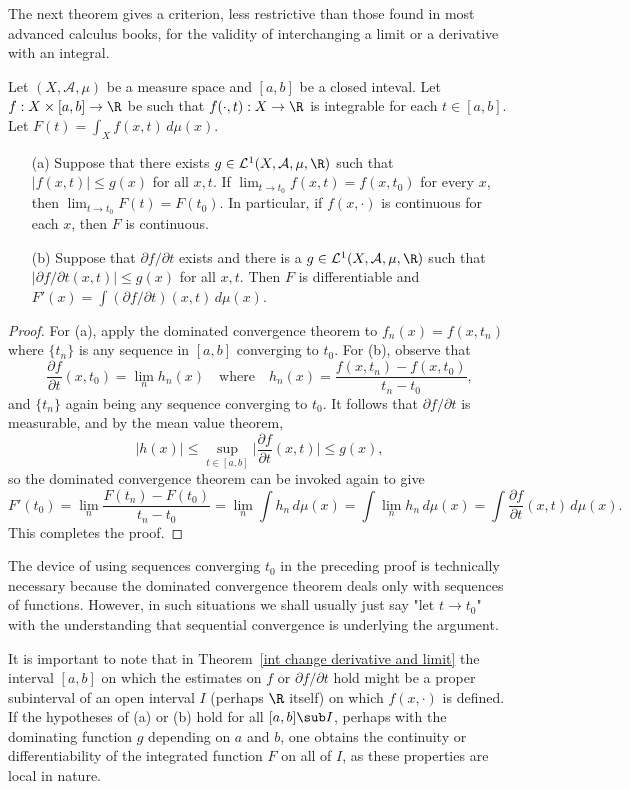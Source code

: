 The next theorem gives a criterion, less restrictive than those found in most advanced calculus books, for the validity of interchanging a limit or a derivative with an integral.
\begin{theorem}\label{int change derivative and limit}
Let $(X,\mathcal{A},\mu)$ be a measure space and $[a,b]$ be a closed inteval. Let $f:X\times[a,b]\to\R$ be such that $f(\cdot,t):X\to\R$ is integrable for each $t\in[a,b]$. Let $F(t)=\int_Xf(x,t)\,d\mu(x)$.
\begin{itemize}
\item[(a)] Suppose that there exists $g\in\mathcal{L}^1(X,\mathcal{A},\mu,\R)$ such that $|f(x,t)|\leq g(x)$ for all $x,t$. If $\lim_{t\to t_0}f(x,t)=f(x,t_0)$ for every $x$, then $\lim_{t\to t_0}F(t)=F(t_0)$. In particular, if $f(x,\cdot)$ is continuous for each $x$, then $F$ is continuous.
\item[(b)] Suppose that $\partial f/\partial t$ exists and there is a $g\in\mathcal{L}^1(X,\mathcal{A},\mu,\R)$ such that $|\partial f/\partial t(x,t)|\leq g(x)$ for all $x,t$. Then $F$ is differentiable and $F'(x)=\int(\partial f/\partial t)(x,t)\,d\mu(x)$.
\end{itemize}
\end{theorem}
\begin{proof}
For (a), apply the dominated convergence theorem to $f_n(x)=f(x,t_n)$ where $\{t_n\}$ is any sequence in $[a,b]$ converging to $t_0$. For (b), observe that
\[\frac{\partial f}{\partial t}(x,t_0)=\lim_nh_n(x)\quad\text{where}\quad h_n(x)=\frac{f(x,t_n)-f(x,t_0)}{t_n-t_0},\]
and $\{t_n\}$ again being any sequence converging to $t_0$. It follows that $\partial f/\partial t$ is measurable, and by the mean value theorem,
\[|h(x)|\leq\sup_{t\in[a,b]}\Big|\frac{\partial f}{\partial t}(x,t)\Big|\leq g(x),\]
so the dominated convergence theorem can be invoked again to give
\[F'(t_0)=\lim_n\frac{F(t_n)-F(t_0)}{t_n-t_0}=\lim_n\int h_n\,d\mu(x)=\int\lim_n h_n\,d\mu(x)=\int\frac{\partial f}{\partial t}(x,t)\,d\mu(x).\]
This completes the proof.
\end{proof}
The device of using sequences converging $t_0$ in the preceding proof is technically necessary because the dominated convergence theorem deals only with sequences of functions. However, in such situations we shall usually just say "let $t\to t_0$" with the understanding that sequential convergence is underlying the argument.
\begin{remark}
It is important to note that in Theorem~\ref{int change derivative and limit} the interval $[a,b]$ on which the estimates on $f$ or $\partial f/\partial t$ hold might be a proper subinterval of an open interval $I$ (perhaps $\R$ itself) on which $f(x,\cdot)$ is defined. If the hypotheses of (a) or (b) hold for all $[a,b]\sub I$, perhaps with the dominating function $g$ depending on $a$ and $b$, one obtains the continuity or differentiability of the integrated function $F$ on all of $I$, as these properties are local in nature.
\end{remark}
